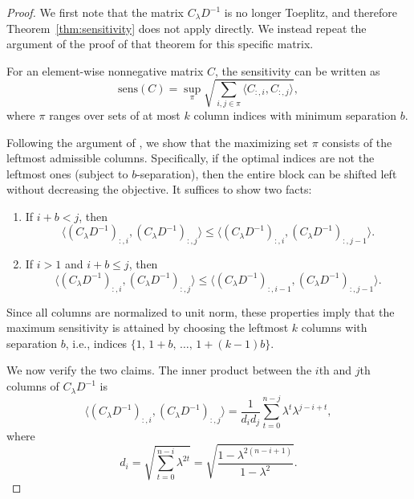 \documentclass{article}
\theoremstyle{plain}
\theoremstyle{definition}
\theoremstyle{remark}
\begin{document}
\begin{proof}
We first note that the matrix $C_\lambda D^{-1}$ is no longer Toeplitz, and therefore Theorem~\ref{thm:sensitivity} does not apply directly. We instead repeat the argument of the proof of that theorem for this specific matrix.

For an element-wise nonnegative matrix $C$, the sensitivity can be written \citep{choquette2023amplified} as
\begin{equation}
    \mathrm{sens}(C)
    = \sup_{\pi} \sqrt{\sum_{i,j \in \pi} \langle C_{:,i}, C_{:,j} \rangle},
\end{equation}
where $\pi$ ranges over sets of at most $k$ column indices with minimum separation $b$.

Following the argument of \citet{kalinin2024}, we show that the maximizing set $\pi$ consists of the leftmost admissible columns. Specifically, if the optimal indices are not the leftmost ones (subject to $b$-separation), then the entire block can be shifted left without decreasing the objective. It suffices to show two facts:
\begin{enumerate}
    \item If $i+b<j$, then
    \[
        \langle (C_\lambda D^{-1})_{:,i}, (C_\lambda D^{-1})_{:,j} \rangle
        \le
        \langle (C_\lambda D^{-1})_{:,i}, (C_\lambda D^{-1})_{:,j-1} \rangle .
    \]
    \item If $i>1$ and $i+b \le j$, then
    \[
        \langle (C_\lambda D^{-1})_{:,i}, (C_\lambda D^{-1})_{:,j} \rangle
        \le
        \langle (C_\lambda D^{-1})_{:,i-1}, (C_\lambda D^{-1})_{:,j-1} \rangle .
    \]
\end{enumerate}
Since all columns are normalized to unit norm, these properties imply that the maximum sensitivity is attained by choosing the leftmost $k$ columns with separation $b$, i.e., indices $\{1,\, 1+b,\, \dots,\, 1+(k-1)b\}$.

We now verify the two claims. The inner product between the $i$th and $j$th columns of $C_\lambda D^{-1}$ is
\begin{equation}
    \langle (C_\lambda D^{-1})_{:,i}, (C_\lambda D^{-1})_{:,j} \rangle
    =
    \frac{1}{d_i d_j}
    \sum_{t=0}^{n-j} \lambda^{t} \lambda^{j-i+t},
\end{equation}
where
\begin{equation}
    d_i
    = \sqrt{\sum_{t=0}^{n-i} \lambda^{2t}}
    = \sqrt{\frac{1-\lambda^{2(n-i+1)}}{1-\lambda^2}} .
\end{equation}


\end{proof}
\end{document}
